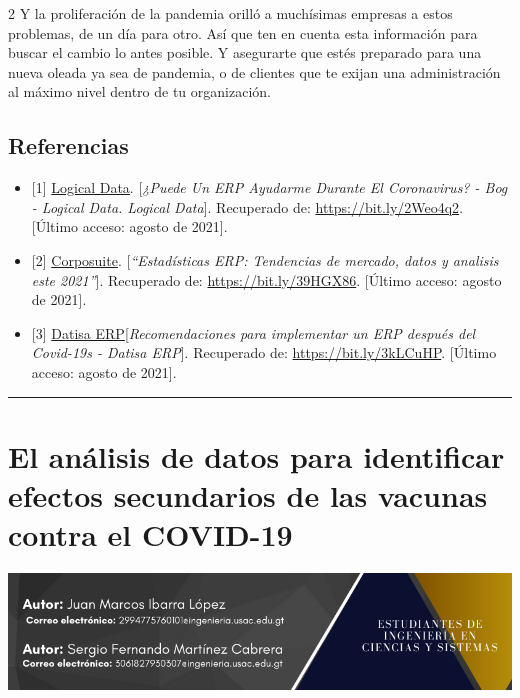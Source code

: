 \documentclass[12pt,spanish,Letterpaper,openany]{book}
\newcommand{\HRule}{\begin{center}\rule{0.5\linewidth}{0.2mm}\end{center}}
\begin{document}
\begin {multicols}{2}
Y la proliferación de la pandemia orilló a muchísimas empresas a estos problemas, de un día
para otro. Así que ten en cuenta esta información para buscar el cambio lo antes posible. Y
asegurarte que estés preparado para una nueva oleada ya sea de pandemia, o de clientes que
te exijan una administración al máximo nivel dentro de tu organización.

\hypertarget{referencias-13}{%
\section{Referencias}\label{referencias-13}}

\begin{itemize}
\item
  {[}1{]} \href{https://www.ld.co.cr/}{Logical Data}. {[}\emph{¿Puede Un ERP Ayudarme Durante El Coronavirus? - Bog - Logical Data. Logical Data}{]}. Recuperado de: \url{https://bit.ly/2Weo4q2}. {[}Último acceso: agosto de 2021{]}.
\item
  {[}2{]} \href{https://corposuite.com.mx/}{Corposuite}. {[}\emph{``Estadísticas ERP: Tendencias de mercado, datos y analisis este 2021''}{]}. Recuperado de: \url{https://bit.ly/39HGX86}. {[}Último acceso: agosto de 2021{]}.
\item
  {[}3{]} \href{https://datisa.es/}{Datisa ERP}{[}\emph{Recomendaciones para implementar un ERP después del Covid-19s - Datisa ERP}{]}. Recuperado de: \url{https://bit.ly/3kLCuHP}. {[}Último acceso: agosto de 2021{]}.
\end{itemize}

\end {multicols}

\medskip

\HRule

\medskip

\hypertarget{pareja67}{%
\chapter{El análisis de datos para identificar efectos secundarios de las vacunas contra el COVID-19}\label{pareja67}}

\begin{center}\includegraphics[width=1\linewidth]{images/pareja67_01} \end{center}
\end{document}
